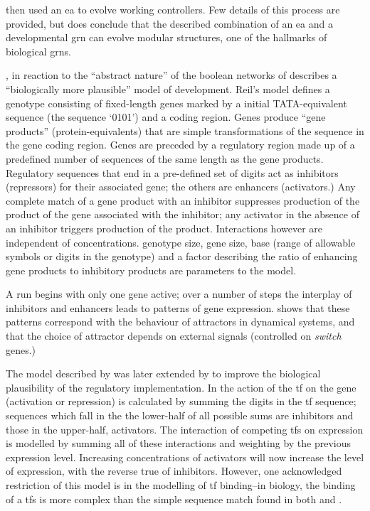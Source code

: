 \cite{Jakobi:1995py} then used an \gls{ea} to evolve working controllers. Few details of this process are
provided, but \cite{Jakobi:1995py} does conclude that the described combination of an \gls{ea} and a developmental
\gls{grn} can evolve modular structures, one of the hallmarks of biological \glspl{grn}.

\cite{Reil:1999rp}, in reaction to the ``abstract nature''\parencite[pg. 1]{Reil:1999rp} of the boolean networks of \cite{Kauffman:1969ne} describes a ``biologically more plausible'' \cite[pg. 1]{Reil:1999rp} model of development. Reil's model defines a genotype consisting of fixed-length genes
marked by a initial TATA-equivalent sequence (the sequence `0101') and a coding region. Genes produce ``gene products''
(protein-equivalents) that are simple transformations of the sequence in the gene coding region. Genes are preceded by a
regulatory region made up of a predefined number of sequences of the same length as the gene products. Regulatory
sequences that end in a pre-defined set of digits act as inhibitors (repressors) for their associated gene; the others
are enhancers (activators.) Any complete match of a gene product with an inhibitor suppresses production of the product
of the gene associated with the inhibitor; any activator in the absence of an inhibitor triggers production of the
product. Interactions however are independent of concentrations. genotype size, gene size, base (range of allowable
symbols or digits in the genotype) and a factor describing the ratio of enhancing gene products to inhibitory products are
parameters to the model.

A run begins with only one gene active; over a number of steps the interplay of inhibitors and enhancers leads to
patterns of gene expression. \cite{Reil:1999rp} shows that these patterns correspond with the behaviour of attractors
in dynamical systems, and that the choice of attractor depends on external signals (controlled on \emph{switch} genes.)

The model described by \cite{Reil:1999rp} was later extended by \cite{Rohlf:2009sh} to improve the biological plausibility of the regulatory implementation. In \cite{Rohlf:2009sh} the action of the \gls{tf} on the gene (activation or repression) is calculated by summing the digits in the \gls{tf} sequence; sequences which fall in the the lower-half of all possible sums are inhibitors and those in the upper-half, activators. The interaction of competing \glspl{tf} on expression is modelled by summing all of these interactions and weighting by the previous expression level. Increasing concentrations of activators will now increase the level of expression, with the reverse true of inhibitors. However, one acknowledged restriction of this model is in the modelling of \gls{tf} binding--in biology, the binding of a \glspl{tf} is more complex than the simple sequence match found in both \cite{Reil:1999rp} and \cite{Rohlf:2009sh}.

